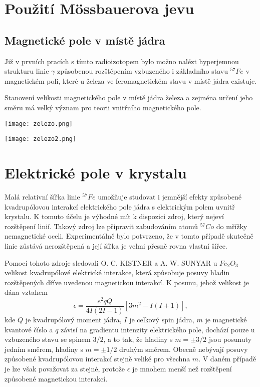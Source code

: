 \documentclass[../../main.tex]{subfiles}
\begin{document}
\section{Použití Mössbauerova jevu}

\subsection{Magnetické pole v místě jádra}

Již v prvních pracích s tímto radioizotopem bylo možno nalézt hyperjemnou strukturu linie $\gamma$ způsobenou rozštěpením vzbuzeného i základního stavu $^{57}Fe$ v magnetickém poli, které u železa ve feromagnetickém stavu v místě jádra existuje.

Stanovení velikosti magnetického pole v místě jádra železa a zejména určení jeho směru má velký význam pro teorii vnitřního magnetického pole. 

\begin{center}
	\texttt{[image: zelezo.png]}
\end{center}

\begin{center}
	\texttt{[image: zelezo2.png]}
\end{center}

\section{Elektrické pole v krystalu}

Malá relativní šířka linie $^{57}Fe$ umožňuje studovat i jemnější efekty způsobené kvadrupólovou interakcí elektrického pole jádra s elektrickým polem uvnitř krystalu. K tomuto účelu je výhodné mít k dispozici zdroj, který nejeví rozštěpení linií. Takový zdroj lze připravit zabudováním atomů $^{57}Co$ do mřížky
nemagnetické oceli. Experimentálně bylo potvrzeno, že v tomto případě skutečně linie zůstává nerozštěpená a její šířka je velmi přesně rovna vlastní šířce.

Pomocí tohoto zdroje sledovali O. C. KISTNER a A. W. SUNYAR u $Fe_2 O_3$ velikost kvadrupólové elektrické interakce, která způsobuje posuvy hladin rozštěpených dříve uvedenou magnetickou interakcí. K posunu, jehož velikost je dána vztahem
\begin{equation}
\epsilon = \dfrac{e^2 q Q}{4I (2I - 1)} [3 m^2 - I(I+1)],
\end{equation}
kde $Q$ je kvadrupólový moment jádra, $I$ je celkový spin jádra, $m$ je magnetické kvantové číslo a $q$ závisí na gradientu intenzity elektrického pole, dochází pouze u vzbuzeného stavu se spinem $3/2$, a to tak, že hladiny s $m = \pm 3/2$ jsou posunuty jedním směrem, hladiny s $m = \pm 1/2$ druhým směrem. Obecně nebývají posuvy způsobené kvadrupólovou interakcí stejně veliké pro všechna $m$. V daném případě je lze však považovat za stejné, protože $\epsilon$ je mnohem menší než rozštěpení způsobené magnetickou interakcí.
\end{document}
